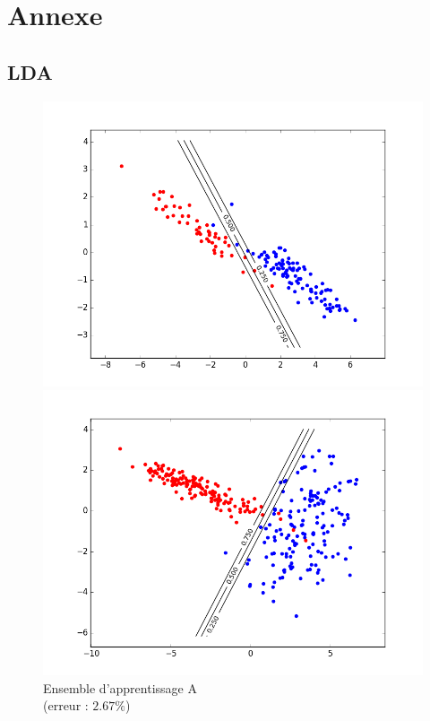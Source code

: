 \documentclass[paper=a4, fontsize=11pt]{article}
\begin{document}
\newpage
\section*{Annexe}
\subsection*{LDA}
\begin{figure}[h]
 \begin{minipage}[b]{.3\linewidth}
 \begin{center}
 \includegraphics[scale=0.25]{figures/LDA_A_train.png}
  \caption*{Ensemble d'apprentissage A \\ (erreur : $2.67\%$)}
 \end{center}
 \end{minipage} \hfill
 \begin{minipage}[b]{.3\linewidth}
  \includegraphics[scale=0.25]{figures/LDA_B_train.png}

\end{minipage}
\end{figure}
\end{document}
